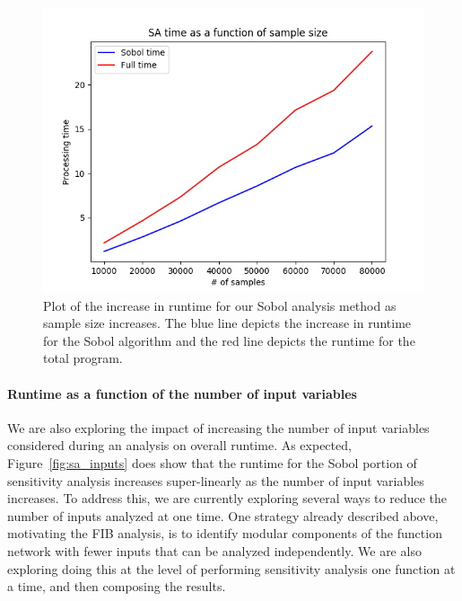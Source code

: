 \documentclass[article, 12pt, oneside]{memoir}
\begin{document}
\begin{figure}
\centering
\includegraphics{figs/sa_samples_vs_runtime.png}
\caption{Plot of the increase in runtime for our Sobol analysis method
as sample size increases. The blue line depicts the increase in runtime
for the Sobol algorithm and the red line depicts the runtime for the
total program.\label{fig:sa_samples}}
\end{figure}


\hypertarget{runtime-as-a-function-of-the-number-of-input-variables}{%
\paragraph{Runtime as a function of the number of input
variables}\label{runtime-as-a-function-of-the-number-of-input-variables}}

We are also exploring the impact of increasing the number of input
variables considered during an analysis on overall runtime. As expected,
Figure~\ref{fig:sa_inputs} does show that the runtime for the Sobol portion of
sensitivity analysis increases super-linearly as the number of input
variables increases. To address this, we are currently exploring several
ways to reduce the number of inputs analyzed at one time. One strategy
already described above, motivating the FIB analysis, is to identify
modular components of the function network with fewer inputs that can be
analyzed independently. We are also exploring doing this at the level of
performing sensitivity analysis one function at a time, and then
composing the results.
\end{document}
